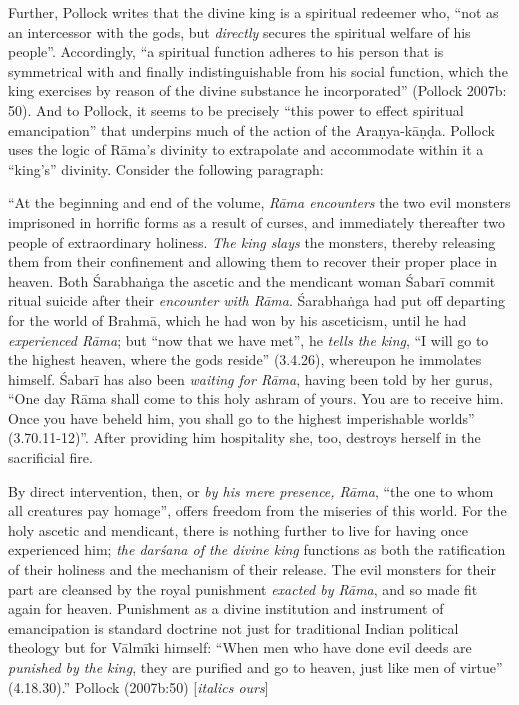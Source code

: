 \newpage

Further, Pollock writes that the divine king is a spiritual redeemer who, “not as an intercessor with the gods, but {\sl directly} secures the spiritual welfare of his people”. Accordingly, “a spiritual function adheres to his person that is symmetrical with and finally indistinguishable from his social function, which the king exercises by reason of the divine substance he incorporated” (Pollock 2007b: 50).  And to Pollock, it seems to be precisely “this power to effect spiritual emancipation” that underpins much of the action of the Araṇya-kāṇḍa. Pollock uses the logic of Rāma’s divinity to extrapolate and accommodate within it a “king’s” divinity. Consider the following paragraph:   

\begin{myquote}
“At the beginning and end of the volume, {\sl Rāma encounters} the two evil monsters imprisoned in horrific forms as a result of curses, and immediately thereafter two people of extraordinary holiness. {\sl The king slays} the monsters, thereby releasing them from their confinement and allowing them to recover their proper place in heaven. Both Śarabhaṅga the ascetic and the mendicant woman Śabarī commit ritual suicide after their {\sl encounter with Rāma}. Śarabhaṅga had put off departing for the world of Brahmā, which he had won by his asceticism, until he had {\sl experienced Rāma}; but “now that we have met”, he {\sl tells the king}, “I will go to the highest heaven, where the gods reside” (3.4.26), whereupon he immolates himself. Śabarī has also been {\sl waiting for Rāma}, having been told by her gurus, “One day Rāma shall come to this holy ashram of yours. You are to receive him. Once you have beheld him, you shall go to the highest imperishable worlds” (3.70.11-12)”. After providing him hospitality she, too, destroys herself in the sacrificial fire. 

By direct intervention, then, or {\sl by his mere presence, Rāma}, “the one to whom all creatures pay homage”, offers freedom from the miseries of this world. For the holy ascetic and mendicant, there is nothing further to live for having once experienced him; {\sl the darśana of the divine king} functions as both the ratification of their holiness and the mechanism of their release. The evil monsters for their part are cleansed by the royal punishment {\sl exacted by Rāma}, and so made fit again for heaven. Punishment as a divine institution and instrument of emancipation is standard doctrine not just for traditional Indian political theology but for Vālmīki himself: “When men who have done evil deeds are {\sl punished by the king}, they are purified and go to heaven, just like men of virtue” (4.18.30).”
\hfill Pollock (2007b:50) [{\sl italics ours}]
\end{myquote}


